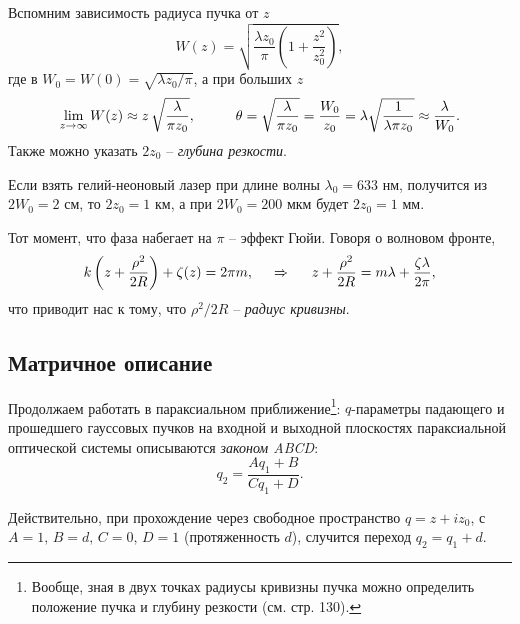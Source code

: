 Вспомним зависимость радиуса пучка от $z$
\begin{equation*}
    W(z) = \sqrt{
        \frac{\lambda z_0}{\pi} \left(
            1 + \frac{z^2}{z_0^2}
        \right)
    },
\end{equation*}
где в $W_0 = W(0) = \sqrt{ \lambda z_0 / \pi}$, а при больших $z$ 
\begin{equation*}
     \lim_{z \to \infty} W(z) \approx z\, \sqrt{\frac{\lambda}{\pi z_0}},
     \hspace{1 cm}
     \theta = \sqrt{\frac{\lambda}{\pi z_0}} = \frac{W_0}{z_0} = 
     \lambda \sqrt{\frac{1}{\lambda \pi z_0}} \approx \frac{\lambda}{W_0}
     .
 \end{equation*} 
Также можно указать $2 z_0$ -- \textit{глубина резкости}. 

Если взять гелий-неоновый лазер при длине волны $\lambda_0 = 633$ нм, получится из $2 W_0 = 2$ см, то $2 z_0 = 1$ км, а при $2 W_0 = 200$ мкм будет $2 z_0 = 1$ мм.

Тот момент, что фаза набегает на $\pi$ -- эффект Гюйи. Говоря о волновом фронте,
\begin{equation*}
    k \left(z + \frac{\rho^2}{2R}\right) + \zeta(z) = 2 \pi m,
    \hspace{0.5cm} \Rightarrow \hspace{0.5cm}
    z + \frac{\rho^2}{2R} = m \lambda + \frac{\zeta \lambda}{2 \pi},
\end{equation*}
что приводит нас к тому, что $\rho^2 / 2 R$ -- \textit{радиус кривизны}.


\subsection{Матричное описание}

Продолжаем работать в параксиальном приближение\footnote{
    Вообще, зная в двух точках радиусы кривизны пучка можно определить положение пучка и глубину резкости (см. стр. 130).
}: $q$-параметры падающего и прошедшего гауссовых пучков на входной и выходной плоскостях параксиальной оптической системы описываются \textit{законом ABCD}:
\begin{equation*}
    q_2 = \frac{A q_1 + B}{C q_1 + D}. 
\end{equation*}

Действительно, при прохождение через свободное пространство $q = z + i z_0$, с $A = 1,\, B = d,\, C=0,\, D=1$ (протяженность $d$), случится переход $q_2 = q_1 + d$. 


